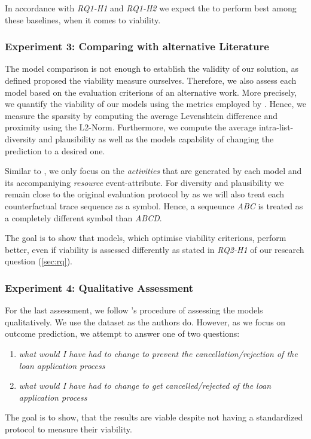 \documentclass[./../../paper.tex]{subfiles}
\begin{document}
In accordance with \emph{RQ1-H1} and \emph{RQ1-H2} we expect the \ModelEVOFSR to perform best among these baselines, when it comes to viability.

\subsubsection{Experiment 3: Comparing with alternative Literature}
The model comparison is not enough to establish the validity of our solution, as defined proposed the viability measure ourselves. Therefore, we also assess each model based on the evaluation criterions of an alternative work. More precisely, we quantify the viability of our models using the metrics employed by \citeauthor{hsieh_DiCE4ELInterpretingProcess_2021}. Hence, we measure the sparsity by computing the average Levenshtein difference and proximity using the L2-Norm. Furthermore, we compute the average intra-list-diversity and plausibility as well as the models capability of changing the prediction to a desired one. 

Similar to \citeauthor{hsieh_DiCE4ELInterpretingProcess_2021}, we only focus on the \emph{activities} that are generated by each model and its accompaniying \emph{resource} event-attribute. For diversity and plausibility we remain close to the original evaluation protocol by \citeauthor{hsieh_DiCE4ELInterpretingProcess_2021} as we will also treat each counterfactual trace sequence as a symbol. Hence, a sequeunce \emph{ABC} is treated as a completely different symbol than \emph{ABCD}.

The goal is to show that models, which optimise viability criterions, perform better, even if viability is assessed differently as stated in \emph{RQ2-H1} of our research question (\autoref{sec:rq}). 

\subsubsection{Experiment 4: Qualitative Assessment}
For the last assessment, we follow \citeauthor{hsieh_DiCE4ELInterpretingProcess_2021}'s procedure of assessing the models qualitatively. We use the dataset as the authors do. However, as we focus on outcome prediction, we attempt to answer one of two questions: 

\begin{enumerate}
    \item \emph{what would I have had to change to prevent the cancellation/rejection of the loan application process}
    \item \emph{what would I have had to change to get cancelled/rejected of the loan application process}
\end{enumerate}

\noindent The goal is to show, that the results are viable despite not having a standardized protocol to measure their viability.
\end{document}
